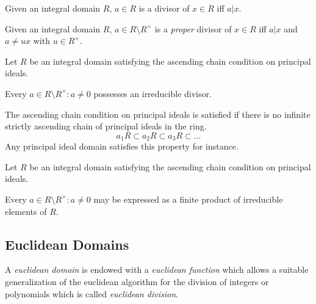 \begin{definition}[Divisor]
   Given an integral domain \(R\), \(a \in R\) is a divisor of \(x \in R\) iff \(a | x\).
\end{definition}

\begin{definition}
   Given an integral domain \(R\), \(a \in R \setminus R^\times\) is a \emph{proper} divisor of \(x \in R\) iff \(a | x\) and \(a \neq ux\) with \(u \in R^\times\).
\end{definition}

\begin{lemma}
   Let \(R\) be an integral domain satisfying the ascending chain condition on principal ideals.

   Every \(a \in R \setminus R^\times: a \neq 0\) possesses an irreducible divisor.
\end{lemma}
\begin{remark}
   The ascending chain condition on principal ideals is satisfied if there is no infinite strictly ascending chain of principal ideals in the ring.
   \[a_1R \subset a_2R \subset a_3R \subset \ldots\]
   Any principal ideal domain satisfies this property for instance.
\end{remark}

\begin{proposition}
   Let \(R\) be an integral domain satisfying the ascending chain condition on principal ideals.

   Every \(a \in R \setminus R^\times: a \neq 0\) may be expressed as a finite product of irreducible elements of \(R\).
\end{proposition}

\subsection{Euclidean Domains}
A \emph{euclidean domain} is endowed with a \emph{euclidean function} which allows a suitable generalization of the euclidean algorithm for the division of integers or polynomials which is called \emph{euclidean division}.

